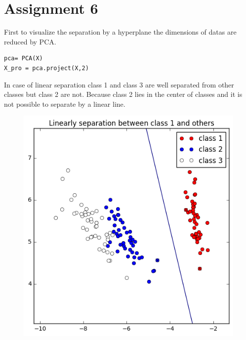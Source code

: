 \documentclass[a4paper,11pt]{article}
\begin{document}
\section*{Assignment 6}
First to visualize the separation by a hyperplane the dimensions of datas are reduced by PCA.

\begin{verbatim}
pca= PCA(X)
X_pro = pca.project(X,2)
\end{verbatim}

In case of linear separation class 1 and class 3 are well separated from other classes but class 2 are not. Because class 2 lies in the center of classes and it is not possible to separate by a linear line.

\begin{figure}[htbp]
  \includegraphics[scale=0.3]{l1_23.png}

\end{figure}
\end{document}
